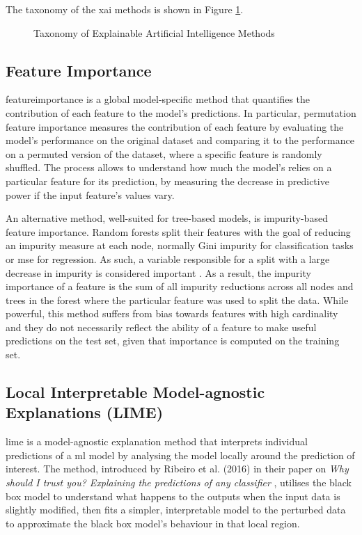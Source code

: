 The taxonomy of the \acrshort{xai} methods is shown in Figure \ref{fig:xai_taxonomy}.
\begin{figure}[h]
    \centering
    
    \caption{Taxonomy of Explainable Artificial Intelligence Methods \cite{Molnar2025}}
    \label{fig:xai_taxonomy}
\end{figure}

\subsection{Feature Importance} \label{sec:featureimportance}

\Gls{featureimportance} is a global model-specific method that quantifies the contribution of each feature to the model's predictions. In particular, permutation feature importance \cite{Breiman2001} measures the contribution of each feature by evaluating the model's performance on the original dataset and comparing it to the performance on a permuted version of the dataset, where a specific feature is randomly shuffled. The process allows to understand how much the model's relies on a particular feature for its prediction, by measuring the decrease in predictive power if the input feature's values vary.

An alternative method, well-suited for tree-based models, is impurity-based feature importance. Random forests split their features with the goal of reducing an impurity measure at each node, normally Gini impurity for classification tasks or \acrfull{mse} for regression. As such, a variable responsible for a split with a large decrease in impurity is considered important \cite{Nembrini2018}. As a result, the impurity importance of a feature is the sum of all impurity reductions across all nodes and trees in the forest where the particular feature was used to split the data. While powerful, this method suffers from bias towards features with high cardinality and they do not necessarily reflect the ability of a feature to make useful predictions on the test set, given that importance is computed on the training set. 

\subsection{Local Interpretable Model-agnostic Explanations (LIME)} \label{sec:lime}

\acrfull{lime} is a model-agnostic explanation method that interprets individual predictions of a \acrlong{ml} model by analysing the model locally around the prediction of interest. The method, introduced by Ribeiro et al. (2016) in their paper on \textit{Why should I trust you? Explaining the predictions of any classifier} \cite{Ribeiro2016}, utilises the black box model to understand what happens to the outputs when the input data is slightly modified, then fits a simpler, interpretable model to the perturbed data to approximate the black box model's behaviour in that local region.

